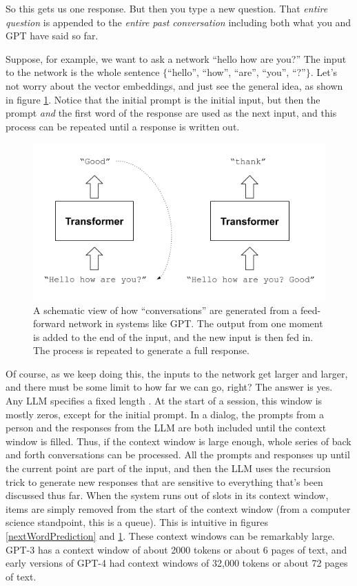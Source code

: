 So this gets us one response. But then you type a new question. That \emph{entire question} is appended to the \emph{entire past conversation} including both what you and GPT have said so far. 

Suppose, for example, we want to ask a network ``hello how are you?'' The input to the network is the whole sentence $\{$``hello'', ``how'', ``are'', ``you'', ``?''$\}$. Let's  not worry about the vector embeddings, and just see the general idea, as shown in figure \ref{gptRecursedInputs}. Notice that the initial prompt is the initial input, but then the prompt \emph{and} the first word of the response are used as the next input, and this process can be repeated until a response is written out.
  
\begin{figure}[h]
\centering
\includegraphics[scale=.7]{./images/gptRecursedInputs.png}
\caption[Jeff Yoshimi]{A schematic view of how ``conversations'' are generated from a feed-forward network in systems like GPT. The output from one moment is added to the end of the input, and the new input is then fed in. The process is repeated to generate a full response.}
\label{gptRecursedInputs}
\end{figure}

Of course, as we keep doing this, the inputs to the network get larger and larger, and there must be some limit to how far we can go, right? The answer is yes. Any LLM specifies a fixed length . At the start of a session, this window is mostly zeros, except for the initial prompt. In a dialog, the prompts from a person and the responses from the LLM are both included until the context window is filled. Thus, if the context window is large enough, whole series of back and forth conversations can be processed. All the prompts and responses up until the current point are part of the input, and then the LLM uses the recursion trick to generate new responses that are sensitive to everything that's been discussed thus far. When the system runs out of slots in its context window, items are simply removed from the start of the context window (from a computer science standpoint, this is a queue). This is intuitive in figures \ref{nextWordPrediction} and \ref{gptRecursedInputs}. These context windows can be remarkably large. GPT-3 has a context window of about 2000 tokens or about 6 pages of text, and early versions of GPT-4 had context windows of 32,000 tokens or about 72 pages of text. 

